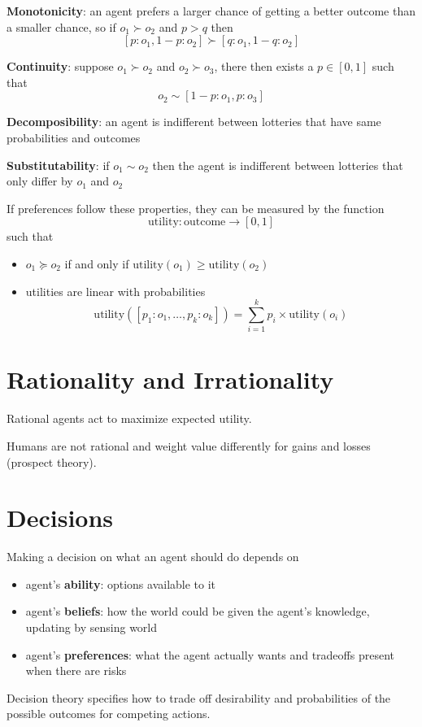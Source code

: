 \documentclass[11pt]{article}
\begin{document}
\textbf{Monotonicity}: an agent prefers a larger chance of getting a better outcome than a smaller
chance, so if \(o_{1} \succ o_{2}\) and \(p > q\) then
$$ [p : o_{1}, 1 - p : o_{2}] \succ [q : o_{1}, 1 - q : o_{2}] $$

\textbf{Continuity}: suppose \(o_{1} \succ o_{2}\) and \(o_{2} \succ o_{3}\), there then exists a
\(p \in [0,1]\) such that
$$ o_{2} \sim [1 - p : o_{1}, p : o_{3}] $$

\textbf{Decomposibility}: an agent is indifferent between lotteries that have same probabilities and
outcomes

\textbf{Substitutability}: if \(o_{1} \sim o_{2}\) then the agent is indifferent between lotteries that
only differ by \(o_{1}\) and \(o_{2}\)

If preferences follow these properties, they can be measured by the function
$$ \text{utility} : \text{outcome} \to [0,1] $$
such that
\begin{itemize}
\item \(o_{1} \succeq o_{2}\) if and only if \(\text{utility}(o_{1}) \ge \text{utility}(o_{2})\)
\item utilities are linear with probabilities
$$ \text{utility}([p_{1} : o_{1}, \dots, p_{k} : o_{k}]) = \sum_{i=1}^{k} p_{i} \times \text{utility}(o_{i}) $$
\end{itemize}
\section{Rationality and Irrationality}
\label{sec:org0a67300}
Rational agents act to maximize expected utility.

Humans are not rational and weight value differently for gains and losses (prospect theory).
\section{Decisions}
\label{sec:orgd5994a5}
Making a decision on what an agent should do depends on
\begin{itemize}
\item agent's \textbf{ability}: options available to it
\item agent's \textbf{beliefs}: how the world could be given the agent's knowledge, updating by sensing
world
\item agent's \textbf{preferences}: what the agent actually wants and tradeoffs present when
there are risks
\end{itemize}

Decision theory specifies how to trade off desirability and probabilities of the possible
outcomes for competing actions.
\end{document}
